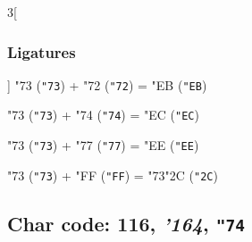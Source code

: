 \documentclass{article}
\newlength{\maxcharwidth}
\begin{document}
\begin{multicols}{3}[\subsubsection{Ligatures}]
{\testfont\char"73\noboundary} ({\tt"73}) + {\testfont\char"72\noboundary} ({\tt"72}) = {\testfont\char"EB\noboundary} ({\tt"EB}) 

{\testfont\char"73\noboundary} ({\tt"73}) + {\testfont\char"74\noboundary} ({\tt"74}) = {\testfont\char"EC\noboundary} ({\tt"EC}) 

{\testfont\char"73\noboundary} ({\tt"73}) + {\testfont\char"77\noboundary} ({\tt"77}) = {\testfont\char"EE\noboundary} ({\tt"EE}) 

{\testfont\char"73\noboundary} ({\tt"73}) + {\testfont\char"FF\noboundary} ({\tt"FF}) = {\testfont\char"73\noboundary}{\testfont\char"2C\noboundary} ({\tt"2C}) 

\end{multicols}

\subsection{Char code: 116, {\it'164}, {\tt"74}}
\label{char_116}

\end{document}
